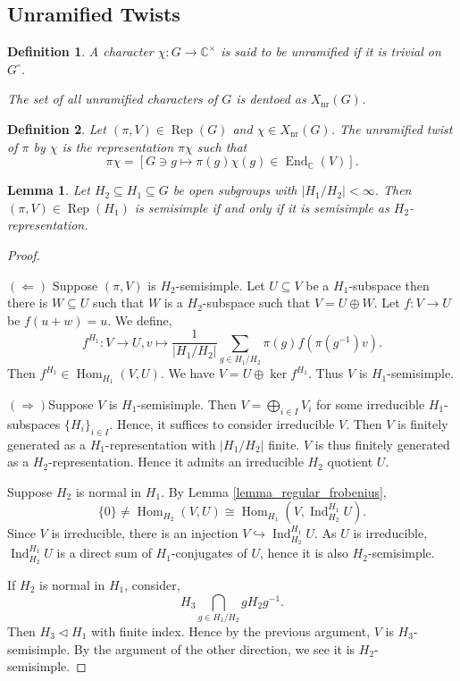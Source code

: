 \documentclass[8pt]{article}
\newtheorem{definition}{Definition}[section]
\newtheorem{lemma}{Lemma}[section]
\DeclareMathOperator{\Ind}{Ind}
\DeclareMathOperator{\Rep}{Rep}
\DeclareMathOperator{\Hom}{Hom}
\DeclareMathOperator{\End}{End}
\DeclareMathOperator{\nr}{nr}
\newcommand{\C}[0]{\mathbb{C}}
\begin{document}
\subsection{Unramified Twists}
\begin{definition}
  A character $\chi:G\to\C^\times$ is said to be unramified if it is trivial on $G^\circ$. 
  \par The set of all unramified characters of $G$ is dentoed as $X_{\nr}(G)$.
\end{definition}
\begin{definition}
  Let $(\pi,V)\in\Rep(G)$ and $\chi\in X_{\nr}(G)$. The unramified twist of $\pi$ by $\chi$ is the representation $\pi\chi$ such that 
  \begin{equation*}
    \pi\chi = [G\ni g\mapsto \pi(g)\chi(g)\in \End_\C(V)].
  \end{equation*}
\end{definition}
\begin{lemma}
  \label{lemma_56}
  Let $H_2\subseteq H_1\subseteq G$ be open subgroups with $\vert H_1/H_2\vert<\infty$. Then $(\pi,V)\in\Rep(H_1)$ is semisimple if and only if it is semisimple as $H_2$-representation.
\end{lemma}
\begin{proof}$\:$
  \par \textbf{$(\Leftarrow)$} Suppose $(\pi,V)$ is $H_2$-semisimple. Let $U\subseteq V$ be a $H_1$-subspace then there is $W\subseteq U$ such that $W$ is a $H_2$-subspace such that $V=U\oplus W$. Let $f:V\to U$ be $f(u+w) = u$. We define,
  \begin{equation*}
    f^{H_1}:V\to U, v\mapsto{\frac 1{\vert H_1/H_2\vert}}\sum_{g\in H_1/H_2}\pi(g)f(\pi(g^{-1})v).
  \end{equation*}
  Then $f^{H_1}\in\Hom_{H_1}(V,U)$. We have $V=U\oplus\ker f^{H_1}$. Thus $V$ is $H_1$-semisimple.
  \par \textbf{$(\Rightarrow)$}Suppose $V$ is $H_1$-semisimple. Then $V=\bigoplus_{i\in I}V_i$ for some irreducible $H_1$-subspaces $\{H_i\}_{i\in I}$. Hence, it suffices to consider irreducible $V$. 
  Then $V$ is finitely generated as a $H_1$-representation with $\vert H_1/H_2\vert$ finite. $V$ is thus finitely generated as a $H_2$-representation. Hence it admits an irreducible $H_2$ quotient $U$.
  \par Suppose $H_2$ is normal in $H_1$. By Lemma \ref{lemma_regular_frobenius},
\begin{equation*}
  \{0\}\not=\Hom_{H_2}(V,U)\cong\Hom_{H_1}(V,\Ind_{H_2}^{H_1}U).
\end{equation*}
Since $V$ is irreducible, there is an injection $V\hookrightarrow\Ind_{H_2}^{H_1}U$. As $U$ is irreducible, $\Ind_{H_2}^{H_1}U$ is a direct sum of $H_1$-conjugates of $U$, hence it is also $H_2$-semisimple. %
\par If $H_2$ is normal in $H_1$, consider,
\begin{equation*}
  H_3\bigcap_{g\in H_1/H_2}gH_2g^{-1}.
\end{equation*}
Then $H_3\triangleleft H_1$ with finite index. Hence by the previous argument, $V$ is $H_3$-semisimple. By the argument of the other direction, we see it is $H_2$-semisimple.
\end{proof}
\end{document}

